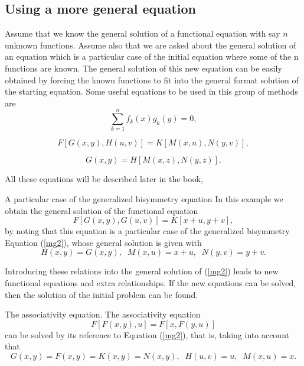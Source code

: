 \documentclass[
	11pt, %
	fleqn, %
	a4paper, %
]{LegrandOrangeBook}
\begin{document}
\subsection{Using a more general equation}\label{s2.5}
Assume that we know the general solution of a
functional equation with say $n$ unknown functions. Assume also that we are asked about the general
solution of an equation which is a particular case of the initial equation where some of the n
functions are known. The general solution of this new equation can be easily obtained by forcing the
known functions to fit into the general format solution of the starting equation.
Some useful equations to be used in this group of methods are
\begin{equation}\label{mg1}
\sum\limits_{k=1}^n f_k(x)g_k(y)=0,
\end{equation}

\begin{equation}\label{mg2}
F[G(x,y),H(u,v)]=K[M(x,u),N(y,v)],
\end{equation}

\begin{equation}\label{mg3}
G(x,y)=H[M(x,z),N(y,z)].
\end{equation}

All these equations will be described later in the book,

\begin{example}{A particular case of the generalized bisymmetry equation} In this example we obtain the
general solution of the functional equation
\begin{equation}
F[G(x,y),G(u,v)]=K[x+u,y+v],
\end{equation}
by noting that this equation is a particular case of the
generalized bisymmetry Equation (\ref{mg2}), whose general
solution is given with
\begin{equation}
H(x,y)=G(x,y),\;\;M(x,u)=x+u,\;\;N(y,v)=y+v.
\end{equation}

Introducing these relations into the general solution of (\ref{mg2}) leads to new functional equations
and extra relationships. If the new equations can be solved, then the solution of the initial problem
can be found.
\end{example}

\begin{example}{The associativity equation. } The associativity equation
\begin{equation}
F[F(x,y),u]=F[x,F(y,u)]
\end{equation}
can be solved by its reference to Equation (\ref{mg2}), that is,
taking into account that
\begin{displaymath}
G(x,y)=F(x,y)=K(x,y)=N(x,y),\;\;H(u,v)=u,\;\;M(x,u)=x.
\end{displaymath}
\end{example}
\end{document}
